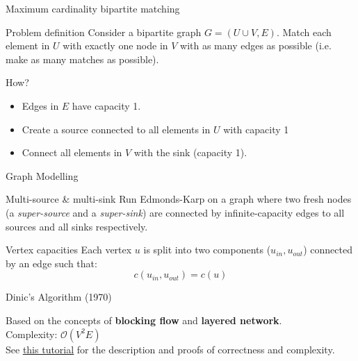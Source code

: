 \documentclass{beamer}
\begin{document}
    \begin{frame}{Maximum cardinality bipartite matching}
        \begin{block}{Problem definition}
            Consider a bipartite graph $G=(U\cup V,E)$. Match each element in $U$ with
            exactly one node in $V$ with as many edges as possible (i.e. make as many
            matches as possible).
        \end{block}
        How?
        \begin{itemize}
            \item Edges in $E$ have capacity 1.
            \item Create a source connected to all elements in $U$ with capacity 1
            \item Connect all elements in $V$ with the sink (capacity 1).
        \end{itemize}
    \end{frame}

    \begin{frame}{Graph Modelling}
        \begin{block}{Multi-source \& multi-sink}
            Run Edmonds-Karp on a graph where two fresh nodes (a \textit{super-source} and
            a \textit{super-sink}) are connected by infinite-capacity edges to all sources and
            all sinks respectively.
        \end{block}

        \begin{block}{Vertex capacities}
            Each vertex $u$ is split into two components ($u_{in}, u_{out}$) connected by an
            edge such that:
            $$c(u_{in},u_{out}) = c(u)$$
        \end{block}
    \end{frame}
    \begin{frame}{Dinic's Algorithm (1970)}
        \begin{Large}
        Based on the concepts of \textbf{blocking flow} and \textbf{layered network}.
        \vspace{12pt}\\
        \alert{Complexity:} $\mathcal{O}(V^2E)$
        \vspace{12pt}\\
        See \href{https://cp-algorithms.com/graph/dinic.html}{\underline{this tutorial}}
        for the description and proofs of correctness and complexity.
        \end{Large}
    \end{frame}
\end{document}
